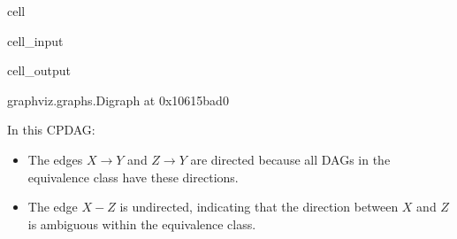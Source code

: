 \documentclass[letterpaper,10pt,english]{jupyterBook}
\begin{document}
\begin{sphinxuseclass}{cell}\begin{sphinxVerbatimInput}

\begin{sphinxuseclass}{cell_input}
\begin{sphinxVerbatim}[commandchars=\\\{\}]
  
 
 
    
\end{sphinxVerbatim}

\end{sphinxuseclass}\end{sphinxVerbatimInput}
\begin{sphinxVerbatimOutput}

\begin{sphinxuseclass}{cell_output}
\begin{sphinxVerbatim}[commandchars=\\\{\}]
\PYGZlt{}graphviz.graphs.Digraph at 0x10615bad0\PYGZgt{}
\end{sphinxVerbatim}

\end{sphinxuseclass}\end{sphinxVerbatimOutput}

\end{sphinxuseclass}
\sphinxAtStartPar
In this CPDAG:
\begin{itemize}
\item {} 
\sphinxAtStartPar
The edges \(X \to Y\) and \(Z \to Y\) are directed because all DAGs in the equivalence class have these directions.

\item {} 
\sphinxAtStartPar
The edge \(X - Z\) is undirected, indicating that the direction between \(X\) and \(Z\) is ambiguous within the equivalence class.

\end{itemize}
\end{document}
